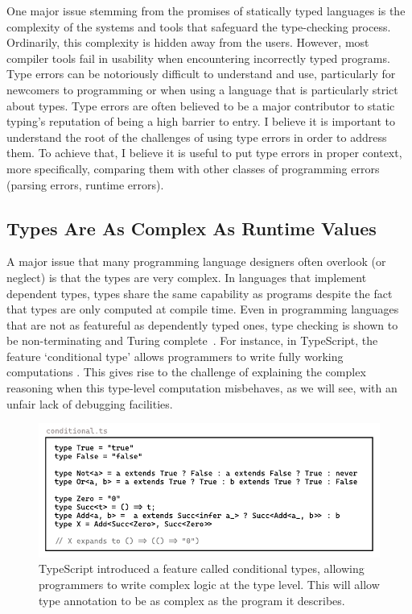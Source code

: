 One major issue stemming from the promises of statically typed languages is the complexity of the systems and tools that safeguard the type-checking process. Ordinarily, this complexity is hidden away from the users. However, most compiler tools fail in usability when encountering incorrectly typed programs. Type errors can be notoriously difficult to understand and use, particularly for newcomers to programming or when using a language that is particularly strict about types. Type errors are often believed to be a major contributor to static typing's reputation of being a high barrier to entry. I believe it is important to understand the root of the challenges of using type errors in order to address them. To achieve that, I believe it is useful to put type errors in proper context, more specifically, comparing them with other classes of programming errors (parsing errors, runtime errors). 

\subsection{Types Are As Complex As Runtime Values}
A major issue that many programming language designers often overlook (or neglect) is that the types are very complex. In languages that implement dependent types, types share the same capability as programs despite the fact that types are only computed at compile time. Even in programming languages that are not as featureful as dependently typed ones, type checking is shown to be non-terminating and Turing complete~\cite{Wells1999-ob}. For instance, in TypeScript, the feature `conditional type' allows programmers to write fully working computations \cite{fig:ts-conditional}. This gives rise to the challenge of explaining the complex reasoning when this type-level computation misbehaves, as we will see, with an unfair lack of debugging facilities.


\begin{figure}[hbt]
  \includegraphics[width=\linewidth]{Conditional}
  \caption{
    \label{fig:ts-conditional}
   TypeScript introduced a feature called conditional types, allowing programmers to write complex logic at the type level. This will allow type annotation to be as complex as the program it describes.
    }
\end{figure}

